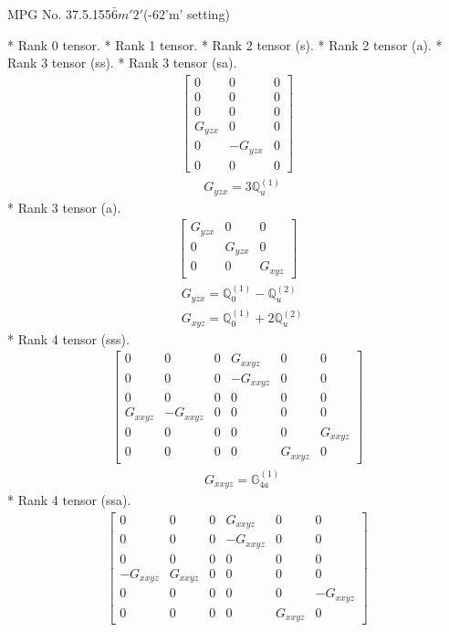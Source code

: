 \documentclass[fleqn,8pt,landscape]{jsarticle}
\begin{document}
\setcounter{MaxMatrixCols}{32}

\renewcommand{\tablename}{Table~}
\renewcommand{\figurename}{Figure~}
\begin{center}
\LARGE
MPG No. 37.5.155\quad$\bar{6}m'2'$\quad(-62'm' setting)
\end{center}
* Rank 0 tensor.
* Rank 1 tensor.
* Rank 2 tensor (s).
* Rank 2 tensor (a).
* Rank 3 tensor (ss).
* Rank 3 tensor (sa).
\begin{align*}
\begin{bmatrix} 0 & 0 & 0 \\ 0 & 0 & 0 \\ 0 & 0 & 0 \\ G_{yzx} & 0 & 0 \\ 0 & - G_{yzx} & 0 \\ 0 & 0 & 0 \end{bmatrix}
\end{align*}
\begin{align*}
& G_{yzx} = 3 \mathbb{Q}_{u}^{(1)}
\end{align*}
* Rank 3 tensor (a).
\begin{align*}
\begin{bmatrix} G_{yzx} & 0 & 0 \\ 0 & G_{yzx} & 0 \\ 0 & 0 & G_{xyz} \end{bmatrix}
\end{align*}
\begin{align*}
& G_{yzx} = \mathbb{Q}_{0}^{(1)} - \mathbb{Q}_{u}^{(2)} \\
& G_{xyz} = \mathbb{Q}_{0}^{(1)} + 2 \mathbb{Q}_{u}^{(2)}
\end{align*}
* Rank 4 tensor (sss).
\begin{align*}
\begin{bmatrix} 0 & 0 & 0 & G_{xxyz} & 0 & 0 \\ 0 & 0 & 0 & - G_{xxyz} & 0 & 0 \\ 0 & 0 & 0 & 0 & 0 & 0 \\ G_{xxyz} & - G_{xxyz} & 0 & 0 & 0 & 0 \\ 0 & 0 & 0 & 0 & 0 & G_{xxyz} \\ 0 & 0 & 0 & 0 & G_{xxyz} & 0 \end{bmatrix}
\end{align*}
\begin{align*}
& G_{xxyz} = \mathbb{G}_{4a}^{(1)}
\end{align*}
* Rank 4 tensor (ssa).
\begin{align*}
\begin{bmatrix} 0 & 0 & 0 & G_{xxyz} & 0 & 0 \\ 0 & 0 & 0 & - G_{xxyz} & 0 & 0 \\ 0 & 0 & 0 & 0 & 0 & 0 \\ - G_{xxyz} & G_{xxyz} & 0 & 0 & 0 & 0 \\ 0 & 0 & 0 & 0 & 0 & - G_{xxyz} \\ 0 & 0 & 0 & 0 & G_{xxyz} & 0 \end{bmatrix}
\end{align*}
\end{document}
